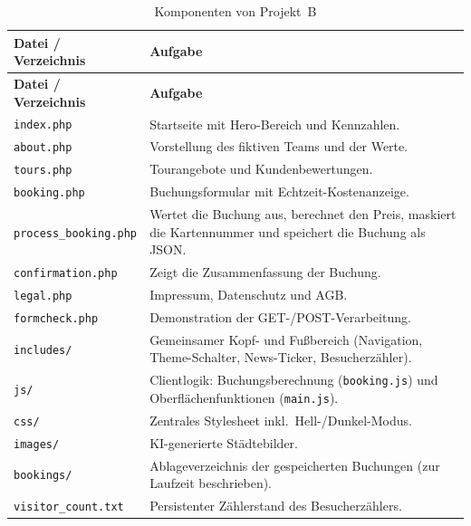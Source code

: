 \begin{small}
\begin{longtable}{@{}L{4.4cm} L{10.0cm}@{}}
\caption{Komponenten von Projekt~B}
\label{tab:b-verzeichnis}\\
\toprule
\textbf{Datei / Verzeichnis} & \textbf{Aufgabe} \\
\midrule
\endfirsthead
\toprule
\textbf{Datei / Verzeichnis} & \textbf{Aufgabe} \\
\midrule
\endhead
\bottomrule
\endfoot
\bottomrule
\endlastfoot
\texttt{index.php} & Startseite mit Hero-Bereich und Kennzahlen. \\
\texttt{about.php} & Vorstellung des fiktiven Teams und der Werte. \\
\texttt{tours.php} & Tourangebote und Kundenbewertungen. \\
\texttt{booking.php} & Buchungsformular mit Echtzeit-Kostenanzeige. \\
\texttt{process\_booking.php} & Wertet die Buchung aus, berechnet den Preis, maskiert die Kartennummer und speichert die Buchung als JSON. \\
\texttt{confirmation.php} & Zeigt die Zusammenfassung der Buchung. \\
\texttt{legal.php} & Impressum, Datenschutz und AGB. \\
\texttt{formcheck.php} & Demonstration der GET-/POST-Verarbeitung. \\
\texttt{includes/} & Gemeinsamer Kopf- und Fu\ss{}bereich (Navigation, Theme-Schalter, News-Ticker, Besucherz\"ahler). \\
\texttt{js/} & Clientlogik: Buchungsberechnung (\texttt{booking.js}) und Oberfl\"achenfunktionen (\texttt{main.js}). \\
\texttt{css/} & Zentrales Stylesheet inkl.\ Hell-/Dunkel-Modus. \\
\texttt{images/} & KI-generierte St\"adtebilder. \\
\texttt{bookings/} & Ablageverzeichnis der gespeicherten Buchungen (zur Laufzeit beschrieben). \\
\texttt{visitor\_count.txt} & Persistenter Z\"ahlerstand des Besucherz\"ahlers. \\
\bottomrule
\end{longtable}
\end{small}
